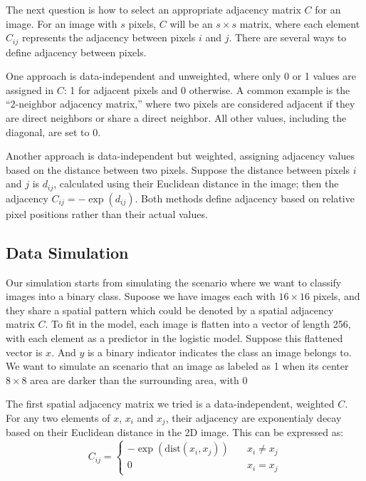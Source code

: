 \documentclass[12pt]{article}
\begin{document}
The next question is how to select an appropriate adjacency matrix \( C \) for an image. For an image with \( s \) pixels, \( C \) will be an \( s \times s \) matrix, where each element \( C_{ij} \) represents the adjacency between pixels \( i \) and \( j \). There are several ways to define adjacency between pixels. 

One approach is data-independent and unweighted, where only 0 or 1 values are assigned in \( C \): 1 for adjacent pixels and 0 otherwise. A common example is the “2-neighbor adjacency matrix,” where two pixels are considered adjacent if they are direct neighbors or share a direct neighbor. All other values, including the diagonal, are set to 0.

Another approach is data-independent but weighted, assigning adjacency values based on the distance between two pixels. Suppose the distance between pixels \( i \) and \( j \) is \( d_{ij} \), calculated using their Euclidean distance in the image; then the adjacency \( C_{ij} = - \exp(d_{ij}) \). Both methods define adjacency based on relative pixel positions rather than their actual values.



\subsection*{Data Simulation}

Our simulation starts from simulating the scenario where we want to classify images into a binary class. Supoose we have images each with \( 16 \times 16 \) pixels, and they share a spatial pattern which could be denoted by a spatial adjacency matrix \( C \). To fit in the model, each image is flatten into a vector of length 256, with each element as a predictor in the logistic model. Suppose this flattened vector is \( x \). And \( y \) is a binary indicator indicates the class an image belongs to. We want to simulate an scenario that an image as labeled as 1 when its center \( 8 \times 8 \) area are darker than the surrounding area, with 0 

The first spatial adjacency matrix we tried is a data-independent, weighted \( C \). For any two elements of \( x \), \( x_i \) and \( x_j \), their adjacency are exponentialy decay based on their Euclidean distance in the 2D image. This can be expressed as:
\[
  C_{ij} = 
  \begin{cases}
    - \exp (\text{dist} (x_i, x_j))  & \quad x_i \neq x_j \\
    0                                & \quad x_i = x_j
  \end{cases}
\]
\end{document}
